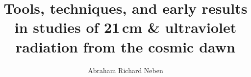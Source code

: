 % 
% 
%
%
%
%
%
%
%
% 
% 

\title{Tools, techniques, and early results in studies of 21\,cm \& ultraviolet radiation from the cosmic dawn}

\author{Abraham Richard Neben}




